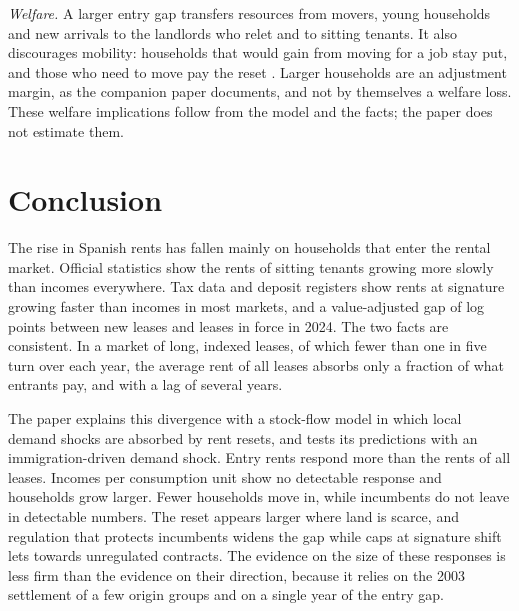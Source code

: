 \documentclass[11pt,a4paper]{article}
\begin{document}
\textit{Welfare.} A larger entry gap transfers resources from movers, young households and new arrivals to the landlords who relet and to sitting tenants. It also discourages mobility: households that would gain from moving for a job stay put, and those who need to move pay the reset \citep{glaeser2003}. Larger households are an adjustment margin, as the companion paper documents, and not by themselves a welfare loss. These welfare implications follow from the model and the facts; the paper does not estimate them.

\section{Conclusion}\label{sec:conclusion}

The rise in Spanish rents has fallen mainly on households that enter the rental market. Official statistics show the rents of sitting tenants growing more slowly than incomes everywhere. Tax data and deposit registers show rents at signature growing faster than incomes in most markets, and a value-adjusted gap of \gapVr{} log points between new leases and leases in force in 2024. The two facts are consistent. In a market of long, indexed leases, of which fewer than one in five turn over each year, the average rent of all leases absorbs only a fraction of what entrants pay, and with a lag of several years.

The paper explains this divergence with a stock-flow model in which local demand shocks are absorbed by rent resets, and tests its predictions with an immigration-driven demand shock. Entry rents respond more than the rents of all leases. Incomes per consumption unit show no detectable response and households grow larger. Fewer households move in, while incumbents do not leave in detectable numbers. The reset appears larger where land is scarce, and regulation that protects incumbents widens the gap while caps at signature shift lets towards unregulated contracts. The evidence on the size of these responses is less firm than the evidence on their direction, because it relies on the 2003 settlement of a few origin groups and on a single year of the entry gap.
\end{document}
